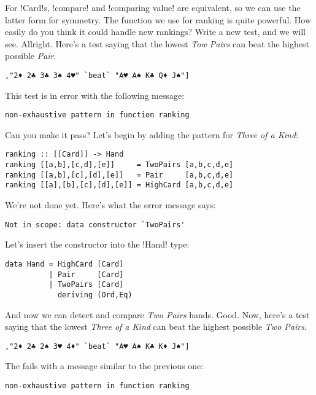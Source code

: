 \success For \il!Card!s, \il!compare! and \il!comparing value! are equivalent, so we can use the latter form for symmetry.
\lhN The function we use for ranking is quite powerful. How easily do you think it could handle new rankings?
\lhA Write a new test, and we will see.
\lhN Allright. Here's a test saying that the lowest \emph{Tow Pairs} can beat the highest possible \emph{Pair}.
\begin{lstlisting}[frame=single]
       ,"2♦ 2♣ 3♣ 3♠ 4♥" `beat` "A♥ A♠ K♣ Q♦ J♠"]
\end{lstlisting}
This test is in error with the following message: \\
\begin{small}
\begin{verbatim}
non-exhaustive pattern in function ranking
\end{verbatim}
\end{small}
Can you make it pass?
\lhA \error Let's begin by adding the pattern for \emph{Three of a Kind}:
\begin{lstlisting}[frame=single]
ranking :: [[Card]] -> Hand
ranking [[a,b],[c,d],[e]]     = TwoPairs [a,b,c,d,e]
ranking [[a,b],[c],[d],[e]]   = Pair     [a,b,c,d,e]
ranking [[a],[b],[c],[d],[e]] = HighCard [a,b,c,d,e] 
\end{lstlisting}
\error We're not done yet.
\lhN Here's what the error message says: \\
\begin{small}
\begin{verbatim}
Not in scope: data constructor `TwoPairs'
\end{verbatim}
\end{small}
\lhA Let's insert the constructor into the \il!Hand! type:
\begin{lstlisting}[frame=single]
data Hand = HighCard [Card]
          | Pair     [Card]
          | TwoPairs [Card]
            deriving (Ord,Eq)
\end{lstlisting}
\success And now we can detect and compare \emph{Two Pairs} hands. 
\newpage
\lhN Good. Now, here's a test saying that the lowest \emph{Three of a Kind} can beat the highest possible \emph{Two Pairs}.
\begin{lstlisting}[frame=single]
       ,"2♦ 2♣ 2♠ 3♥ 4♦" `beat` "A♥ A♠ K♣ K♦ J♠"]
\end{lstlisting}
The fails with a message similar to the previous one: \\
\begin{small}
\begin{verbatim}
non-exhaustive pattern in function ranking
\end{verbatim}
\end{small}
